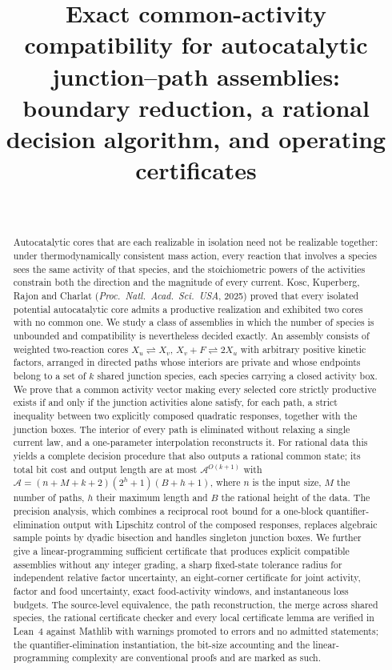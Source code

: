 \documentclass[11pt,a4paper]{article}
\title{Exact common-activity compatibility for autocatalytic junction--path assemblies:\\ boundary reduction, a rational decision algorithm, and operating certificates}
\author{\PaperAuthor\\ \PaperAffiliation}
\date{\PaperDate}
\theoremstyle{plain}
\theoremstyle{definition}
\theoremstyle{remark}
\newcommand{\rev}{\rightleftharpoons}
\newcommand{\Abound}{\mathcal{A}}
\begin{document}
\maketitle

\begin{abstract}
Autocatalytic cores that are each realizable in isolation need not be realizable together: under thermodynamically consistent mass action, every reaction that involves a species sees the same activity of that species, and the stoichiometric powers of the activities constrain both the direction and the magnitude of every current. Kosc, Kuperberg, Rajon and Charlat (\emph{Proc.\ Natl.\ Acad.\ Sci.\ USA}, 2025) proved that every isolated potential autocatalytic core admits a productive realization and exhibited two cores with no common one. We study a class of assemblies in which the number of species is unbounded and compatibility is nevertheless decided exactly. An assembly consists of weighted two-reaction cores $X_u\rev X_v$, $X_v+F\rev 2X_u$ with arbitrary positive kinetic factors, arranged in directed paths whose interiors are private and whose endpoints belong to a set of $k$ shared junction species, each species carrying a closed activity box. We prove that a common activity vector making every selected core strictly productive exists if and only if the junction activities alone satisfy, for each path, a strict inequality between two explicitly composed quadratic responses, together with the junction boxes. The interior of every path is eliminated without relaxing a single current law, and a one-parameter interpolation reconstructs it. For rational data this yields a complete decision procedure that also outputs a rational common state; its total bit cost and output length are at most $\Abound^{O(k+1)}$ with $\Abound=(n+M+k+2)(2^h+1)(B+h+1)$, where $n$ is the input size, $M$ the number of paths, $h$ their maximum length and $B$ the rational height of the data. The precision analysis, which combines a reciprocal root bound for a one-block quantifier-elimination output with Lipschitz control of the composed responses, replaces algebraic sample points by dyadic bisection and handles singleton junction boxes. We further give a linear-programming sufficient certificate that produces explicit compatible assemblies without any integer grading, a sharp fixed-state tolerance radius for independent relative factor uncertainty, an eight-corner certificate for joint activity, factor and food uncertainty, exact food-activity windows, and instantaneous loss budgets. The source-level equivalence, the path reconstruction, the merge across shared species, the rational certificate checker and every local certificate lemma are verified in Lean~4 against Mathlib with warnings promoted to errors and no admitted statements; the quantifier-elimination instantiation, the bit-size accounting and the linear-programming complexity are conventional proofs and are marked as such.
\end{abstract}
\end{document}
